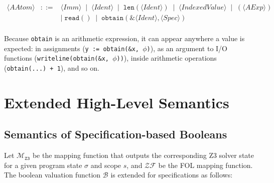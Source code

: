 \documentclass{article}
\begin{document}
\[
\begin{array}{rcl}
\langle \mathit{AAtom} \rangle
&::=&
\langle \mathit{Imm} \rangle
\;\mid\;
\langle \mathit{Ident} \rangle
\;\mid\;
\mathtt{len}(\langle \mathit{Ident} \rangle)
\;\mid\;
\langle \mathit{IndexedValue} \rangle
\;\mid\;
(\langle \mathit{AExp} \rangle) \\[2pt]
&& \mid\;
\mathtt{read}()
\;\mid\;
\mathbf{\mathtt{obtain}( \texttt{\&}\langle \mathit{Ident} \rangle, \langle \mathit{Spec} \rangle )} \\[4pt]
\end{array}
\]

Because \texttt{obtain} is an arithmetic expression, it can appear anywhere a value is expected: in assignments (\texttt{y := obtain(\&x, $\phi$)}), as an argument to I/O functions (\texttt{writeline(obtain(\&x, $\phi$))}), inside arithmetic operations (\texttt{obtain(...) + 1}), and so on.

\section{Extended High-Level Semantics}

\subsection{Semantics of Specification-based Booleans}
Let $\mathcal{M}_{\mathtt{Z3}}$ be the mapping function that outputs the corresponding Z3 solver state for a given program state $\sigma$ and scope $s$, and $\mathcal{ZF}$ be the FOL mapping function. The boolean valuation function $\mathcal{B}$ is extended for specifications as follows:

\begin{table}[h!]
\centering
\renewcommand{\arraystretch}{1.6} 
\large 
{}
\end{table}
\end{document}
